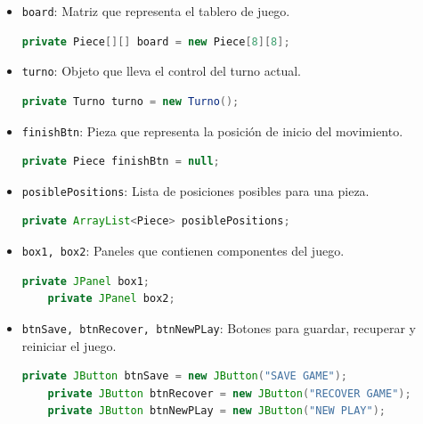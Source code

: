 \documentclass{article}
\begin{document}
\begin{itemize}
  \item \texttt{board}: Matriz que representa el tablero de juego.
  \begin{lstlisting}[language=java,caption={Atributo \texttt{board} en la clase \texttt{Board}}]
    private Piece[][] board = new Piece[8][8];
  \end{lstlisting}

  \item \texttt{turno}: Objeto que lleva el control del turno actual.
  \begin{lstlisting}[language=java,caption={Atributo \texttt{turno} en la clase \texttt{Board}}]
    private Turno turno = new Turno();
  \end{lstlisting}

  \item \texttt{finishBtn}: Pieza que representa la posición de inicio del movimiento.
  \begin{lstlisting}[language=java,caption={Atributo \texttt{finishBtn} en la clase \texttt{Board}}]
    private Piece finishBtn = null;
  \end{lstlisting}

  \item \texttt{posiblePositions}: Lista de posiciones posibles para una pieza.
  \begin{lstlisting}[language=java,caption={Atributo \texttt{posiblePositions} en la clase \texttt{Board}}]
    private ArrayList<Piece> posiblePositions;
  \end{lstlisting}

  \item \texttt{box1, box2}: Paneles que contienen componentes del juego.
  \begin{lstlisting}[language=java,caption={Atributos \texttt{box1} y \texttt{box2} en la clase \texttt{Board}}]
    private JPanel box1;
    private JPanel box2;
  \end{lstlisting}

  \item \texttt{btnSave, btnRecover, btnNewPLay}: Botones para guardar, recuperar y reiniciar el juego.
  \begin{lstlisting}[language=java,caption={Atributos \texttt{btnSave}, \texttt{btnRecover}, y \texttt{btnNewPLay} en la clase \texttt{Board}}]
    private JButton btnSave = new JButton("SAVE GAME");
    private JButton btnRecover = new JButton("RECOVER GAME");
    private JButton btnNewPLay = new JButton("NEW PLAY");
  \end{lstlisting}
\end{itemize}
\end{document}
